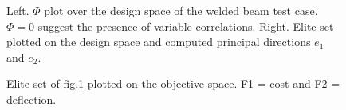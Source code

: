 \begin{figure}[h!]
\begin{minipage}[b]{1\linewidth}
 \centering
\end{minipage}
\caption{Left. $\Phi$ plot over the design space of the welded beam test case. $\Phi = 0$ suggest the presence of variable correlations. Right. Elite-set plotted on the design space and computed principal directions $e_1$ and $e_2$.} 
\label{reco1}
\end{figure}

\begin{figure}[h!]
\begin{minipage}[b]{1\linewidth}
 \centering
\end{minipage}
\caption{Elite-set of fig.\ref{reco1} plotted on the objective space. F1 = cost and F2 = deflection.} 
\label{Pareto1}
\end{figure}


